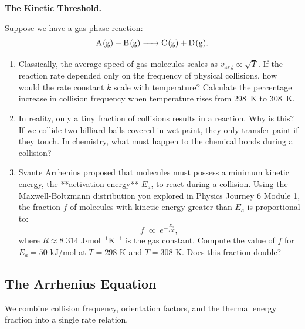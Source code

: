 \documentclass[12pt, a4paper]{book}
\begin{document}
\begin{puzzlebox}
\textbf{The Kinetic Threshold.}

Suppose we have a gas-phase reaction:
\[
  \ce{A(g) + B(g) -> C(g) + D(g)}.
\]
\begin{enumerate}[label=(\alph*), leftmargin=*]
  \item Classically, the average speed of gas molecules scales as $v_{\text{avg}} \propto \sqrt{T}$. If the reaction rate depended only on the frequency of physical collisions, how would the rate constant $k$ scale with temperature? Calculate the percentage increase in collision frequency when temperature rises from \SI{298}{K} to \SI{308}{K}.
  \item In reality, only a tiny fraction of collisions results in a reaction. Why is this? If we collide two billiard balls covered in wet paint, they only transfer paint if they touch. In chemistry, what must happen to the chemical bonds during a collision?
  \item Svante Arrhenius proposed that molecules must possess a minimum kinetic energy, the **activation energy** $E_a$, to react during a collision.
  Using the Maxwell-Boltzmann distribution you explored in Physics Journey 6 Module 1, the fraction $f$ of molecules with kinetic energy greater than $E_a$ is proportional to:
  \[
    f \;\propto\; e^{-\frac{E_a}{RT}},
  \]
  where $R \approx 8.314$ J$\cdot$mol$^{-1}$K$^{-1}$ is the gas constant.
  Compute the value of $f$ for $E_a = 50$ kJ/mol at $T = 298$ K and $T = 308$ K. Does this fraction double?
\end{enumerate}
\end{puzzlebox}

\subsection{The Arrhenius Equation}

We combine collision frequency, orientation factors, and the thermal energy fraction into a single rate relation.
\end{document}
